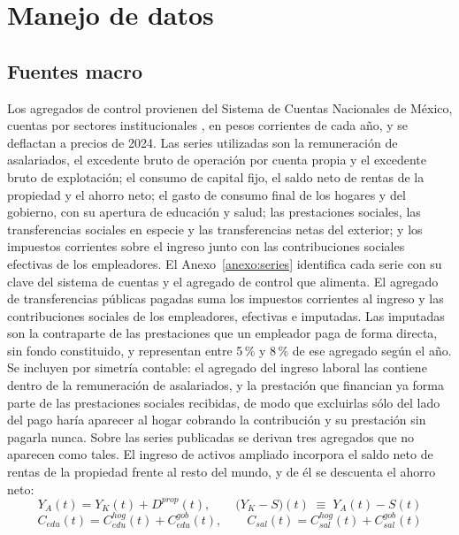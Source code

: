 \documentclass[11pt,a4paper]{article}
\begin{document}
\section{Manejo de datos}
\subsection{Fuentes macro}
Los agregados de control provienen del Sistema de Cuentas Nacionales de México, cuentas por
sectores institucionales \citep{inegi_scnm}, en pesos corrientes de cada año, y se deflactan a precios de 2024. Las series
utilizadas son la remuneración de asalariados, el excedente bruto de operación por cuenta propia
y el excedente bruto de explotación; el consumo de capital fijo, el saldo neto de rentas de la
propiedad y el ahorro neto; el gasto de consumo final de los hogares y del gobierno, con su
apertura de educación y salud; las prestaciones sociales, las transferencias sociales en especie
y las transferencias netas del exterior; y los impuestos corrientes sobre el ingreso junto con
las contribuciones sociales efectivas de los empleadores. El Anexo~\ref{anexo:series} identifica
cada serie con su clave del sistema de cuentas y el agregado de control que alimenta.
El agregado de transferencias públicas pagadas suma los impuestos corrientes al ingreso y las
contribuciones sociales de los empleadores, efectivas e imputadas. Las imputadas son la
contraparte de las prestaciones que un empleador paga de forma directa, sin fondo constituido, y
representan entre 5\,\% y 8\,\% de ese agregado según el año. Se incluyen por simetría contable:
el agregado del ingreso laboral las contiene dentro de la remuneración de asalariados, y la
prestación que financian ya forma parte de las prestaciones sociales recibidas, de modo que
excluirlas sólo del lado del pago haría aparecer al hogar cobrando la contribución y su prestación
sin pagarla nunca.
Sobre las series publicadas se derivan tres agregados que no aparecen como tales. El ingreso de
activos ampliado incorpora el saldo neto de rentas de la propiedad frente al resto del mundo, y
de él se descuenta el ahorro neto:
\begin{equation}
\label{eq:activos}
Y_A(t) = Y_K(t) + D^{prop}(t), \qquad
\big(Y_K - S\big)(t) \;\equiv\; Y_A(t) - S(t)
\end{equation}
\begin{equation}
\label{eq:cfuncion}
C_{edu}(t) = C^{hog}_{edu}(t) + C^{gob}_{edu}(t), \qquad
C_{sal}(t) = C^{hog}_{sal}(t) + C^{gob}_{sal}(t)
\end{equation}
\end{document}
